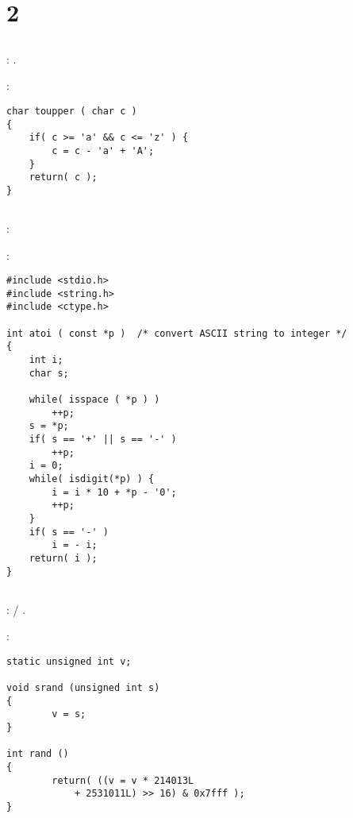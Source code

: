 \section{ 2}

\subsection{}

: .

:

\begin{lstlisting}
char toupper ( char c )
{
    if( c >= 'a' && c <= 'z' ) {
        c = c - 'a' + 'A';
    }
    return( c );
}
\end{lstlisting}

\subsection{}

: 

:

\begin{lstlisting}
#include <stdio.h>
#include <string.h>
#include <ctype.h>

int atoi ( const *p )  /* convert ASCII string to integer */
{
    int i;
    char s;

    while( isspace ( *p ) )
        ++p;
    s = *p;
    if( s == '+' || s == '-' )
        ++p;
    i = 0;
    while( isdigit(*p) ) {
        i = i * 10 + *p - '0';
        ++p;
    }
    if( s == '-' )
        i = - i;
    return( i );
}
\end{lstlisting}

\subsection{}

:  / .

:

\begin{lstlisting}
static unsigned int v;

void srand (unsigned int s)
{
        v = s;
}

int rand ()
{
        return( ((v = v * 214013L
            + 2531011L) >> 16) & 0x7fff );
}
\end{lstlisting}

